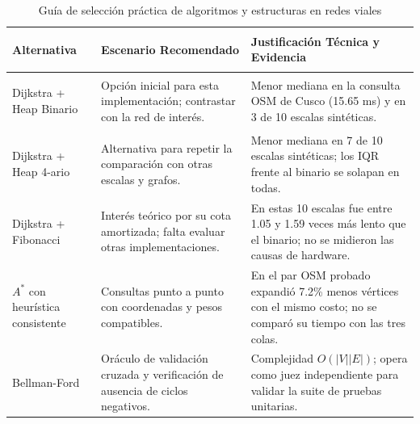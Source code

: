 \begin{table}[H]
    \centering
    \fontsize{9}{11}\selectfont
    \renewcommand{\arraystretch}{1.15}
    \caption{Guía de selección práctica de algoritmos y estructuras en redes viales}
    \label{tab:guia_seleccion}
    \begin{tabularx}{\textwidth}{@{}>{\bfseries\raggedright\arraybackslash}p{3.3cm} >{\raggedright\arraybackslash}p{4.2cm} >{\raggedright\arraybackslash}X@{}}
        \toprule
        \textbf{Alternativa} & \textbf{Escenario Recomendado} & \textbf{Justificación Técnica y Evidencia} \\
        \midrule
        Dijkstra + Heap Binario & Opción inicial para esta implementación; contrastar con la red de interés. & Menor mediana en la consulta OSM de Cusco (15.65 ms) y en 3 de 10 escalas sintéticas. \\
        \addlinespace
        Dijkstra + Heap 4-ario & Alternativa para repetir la comparación con otras escalas y grafos. & Menor mediana en 7 de 10 escalas sintéticas; los IQR frente al binario se solapan en todas. \\
        \addlinespace
        Dijkstra + Fibonacci & Interés teórico por su cota amortizada; falta evaluar otras implementaciones. & En estas 10 escalas fue entre 1.05 y 1.59 veces más lento que el binario; no se midieron las causas de hardware. \\
        \addlinespace
        $A^*$ con heurística consistente & Consultas punto a punto con coordenadas y pesos compatibles. & En el par OSM probado expandió 7.2\% menos vértices con el mismo costo; no se comparó su tiempo con las tres colas. \\
        \addlinespace
        Bellman-Ford & Oráculo de validación cruzada y verificación de ausencia de ciclos negativos. & Complejidad $O(|V||E|)$; opera como juez independiente para validar la suite de pruebas unitarias. \\
        \bottomrule
    \end{tabularx}
\end{table}

